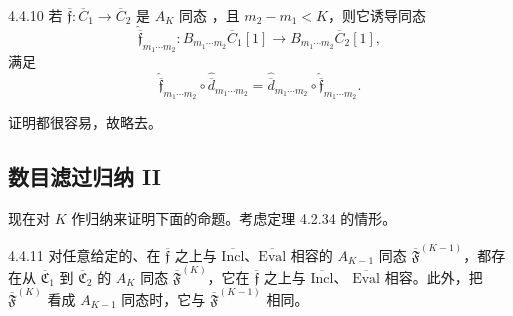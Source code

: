 \begin{lemma}{4.4.10}\label{lem:4-4-10}
若
$\overline{\mathfrak f}\colon\overline C_1\to\overline C_2$
是 $A_K$ 同态
，且 $m_2-m_1<K$，则它诱导同态
\[
 \widehat{\overline{\mathfrak f}}_{m_1\cdots m_2}\colon
 B_{m_1\cdots m_2}\overline C_1[1]
 \longrightarrow B_{m_1\cdots m_2}\overline C_2[1],
\]
满足
\[
 \widehat{\overline{\mathfrak f}}_{m_1\cdots m_2}
 \circ\widehat{\overline d}_{m_1\cdots m_2}
 =\widehat{\overline d}_{m_1\cdots m_2}
 \circ\widehat{\overline{\mathfrak f}}_{m_1\cdots m_2}.
\]
\end{lemma}

证明都很容易，故略去。

\subsection{数目滤过归纳 II}
\label{subsec:4-4-3}

现在对 $K$ 作归纳来证明下面的命题。考虑定理 4.2.34 的情形。

\begin{proposition}{4.4.11}\label{prop:4-4-11}
对任意给定的、在 $\overline{\mathfrak f}$ 之上与
$\overline{\mathrm{Incl}}$、$\overline{\mathrm{Eval}}$ 相容的
$A_{K-1}$ 同态 $\overline{\mathfrak F}^{(K-1)}$，都存在从
$\overline{\mathfrak C}_1$ 到 $\overline{\mathfrak C}_2$ 的
$A_K$ 同态 $\overline{\mathfrak F}^{(K)}$，它在
$\overline{\mathfrak f}$ 之上与 $\overline{\mathrm{Incl}}$、
$\overline{\mathrm{Eval}}$ 相容。此外，把
$\overline{\mathfrak F}^{(K)}$ 看成 $A_{K-1}$ 同态时，它与
$\overline{\mathfrak F}^{(K-1)}$ 相同。
\end{proposition}

